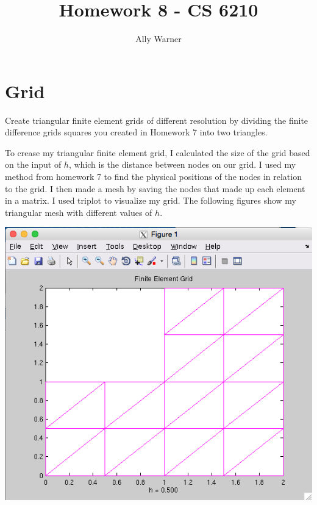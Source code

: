 \documentclass[11pt, oneside]{article}   	%
\title{Homework 8 - CS 6210}
\author{Ally Warner}
\begin{document}
\maketitle

\section{Grid}

Create triangular finite element grids of different resolution by dividing the finite difference grids squares you created in Homework 7 into two triangles.

To crease my triangular finite element grid, I calculated the size of the grid based on the input of $h$, which is the distance between nodes on our grid. I used my method from homework 7 to find the physical positions of the nodes in relation to the grid. I then made a mesh by saving the nodes that made up each element in a matrix. I used triplot to visualize my grid. The following figures show my triangular mesh with different values of $h$. \\

\centerline{\includegraphics[scale = 0.55]{Grid_h1.png}}

\vspace{5mm}
\end{document}

